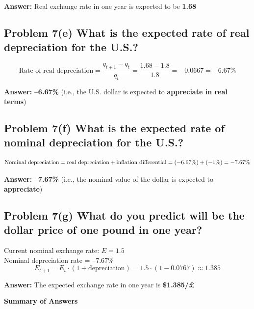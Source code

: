 \documentclass[
]{article}
\begin{document}
\textbf{Answer:} Real exchange rate in one year is expected to be
\textbf{1.68}

\subsection{Problem 7(e) What is the expected rate of real depreciation
for the
U.S.?}\label{problem-7e-what-is-the-expected-rate-of-real-depreciation-for-the-u.s.}

\[
\text{Rate of real depreciation} = \frac{q_{t+1} - q_t}{q_t} = \frac{1.68 - 1.8}{1.8} = -0.0667 = -6.67\%
\]

\textbf{Answer:} \textbf{--6.67\%} (i.e., the U.S. dollar is expected to
\textbf{appreciate in real terms})

\subsection{\texorpdfstring{Problem 7(f) What is the expected rate of
\textbf{nominal depreciation} for the
U.S.?}{Problem 7(f) What is the expected rate of nominal depreciation for the U.S.?}}\label{problem-7f-what-is-the-expected-rate-of-nominal-depreciation-for-the-u.s.}

\[
\text{Nominal depreciation} = \text{real depreciation} + \text{inflation differential} \\
= (-6.67\%) + (-1\%) = -7.67\%
\]

\textbf{Answer:} \textbf{--7.67\%} (i.e., the nominal value of the
dollar is expected to \textbf{appreciate})

\subsection{\texorpdfstring{Problem 7(g) What do you predict will be the
\textbf{dollar price of one pound} in one
year?}{Problem 7(g) What do you predict will be the dollar price of one pound in one year?}}\label{problem-7g-what-do-you-predict-will-be-the-dollar-price-of-one-pound-in-one-year}

Current nominal exchange rate: \(E = 1.5\)\\
Nominal depreciation rate = --7.67\%\\
\[
E_{t+1} = E_t \cdot (1 + \text{depreciation}) = 1.5 \cdot (1 - 0.0767) \approx 1.385
\]

\textbf{Answer:} The expected exchange rate in one year is
\textbf{\$1.385/£}

\textbf{Summary of Answers}
\end{document}
